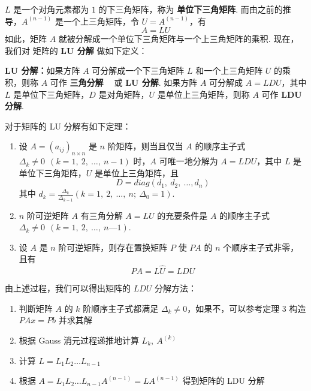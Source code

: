             $L$ 是一个对角元素都为 $1$ 的下三角矩阵，称为 \textbf{单位下三角矩阵}. 而由之前的推导，$A^{(n-1)}$ 是一个上三角矩阵，令 $U = A^{(n-1)}$，有
            \begin{equation*}
                A = LU
            \end{equation*}
            如此，矩阵 $A$ 就被分解成一个单位下三角矩阵与一个上三角矩阵的乘积. 现在，我们对 矩阵的 \textbf{LU 分解} 做如下定义：
            \par \textbf{LU 分解：}如果方阵 $A$ 可分解成一个下三角矩阵 $L$ 和一个上三角矩阵 $U$ 的乘积，则称 $A$ 可作 \textbf{三角分解 \ } 或 \textbf{LU 分解}. 如果方阵 $A$ 可分解成 $A = LDU$，其中 $L$ 是单位下三角矩阵，$D$ 是对角矩阵，$U$ 是单位上三角矩阵，则称 $A$ 可作 \textbf{LDU 分解}.
            \par 对于矩阵的 LU 分解有如下定理：
            \begin{enumerate}
                \item 设 $A = (a_{ij})_{n \times n}$ 是 $n$ 阶矩阵，则当且仅当 $A$ 的顺序主子式 $\Delta_k \ne 0 \ \ (k = 1, \ 2, \ \dots, \ n - 1)$ 时，$A$ 可唯一地分解为 $A = LDU$，其中 $L$ 是单位下三角矩阵，$U$ 是单位上三角矩阵，且
                    \begin{equation*}
                        D = diag(d_1, \ d_2, \ \dots, d_n)
                    \end{equation*}
                    其中 $d_k = \frac{\Delta_k}{\Delta_{k-1}}(k = 1, \ 2, \ \dots, \ n; \ \Delta_0 = 1)$.
                \item $n$ 阶可逆矩阵 $A$ 有三角分解 $A = LU$ 的充要条件是 $A$ 的顺序主子式 $\Delta_k \ne 0 \ \ (k = 1, \ 2, \ \dots, \ n — 1)$.
                \item 设 $A$ 是 $n$ 阶可逆矩阵，则存在置换矩阵 $P$ 使 $PA$ 的 $n$ 个顺序主子式非零，且有
                    \begin{equation*}
                        PA = L\hat{U} = LDU
                    \end{equation*}
            \end{enumerate}

            \par 由上述过程，我们可以得出矩阵的 $LDU$ 分解方法：
            \begin{enumerate}
                \item 判断矩阵 $A$ 的 $k$ 阶顺序主子式都满足 $\Delta_k \ne 0$，如果不，可以参考定理 $3$ 构造 $PAx = Pb$ 并求其解
                \item 根据 Gauss 消元过程递推地计算 $L_k, \ A^{(k)}$
                \item 计算 $L = L_{1}L_{2} \dots L_{n-1}$
                \item 根据 $A = L_{1}L_{2} \dots L_{n-1}A^{(n-1)} = LA^{(n-1)}$ 得到矩阵的 LDU 分解
            \end{enumerate}

